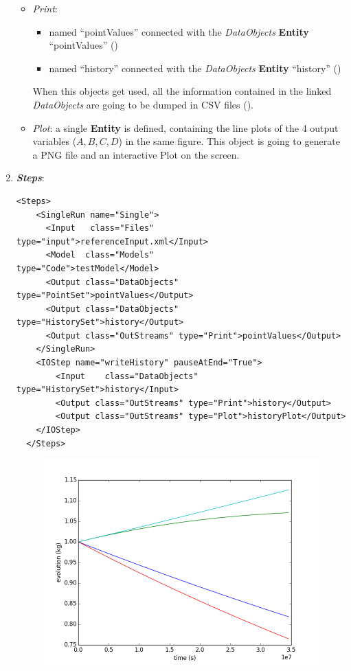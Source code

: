 \begin{enumerate}
  \begin{itemize}
    \item \textit{Print}: 
     \begin{itemize}
       \item named ``pointValues'' connected with the \textit{DataObjects} \textbf{Entity} ``pointValues'' 
                ()
       \item named ``history'' connected with the \textit{DataObjects} \textbf{Entity} ``history'' ()          
     \end{itemize}         
      When this objects get used, all the information contained in the linked  \textit{DataObjects} are going 
    to be dumped in CSV files ().
    \item \textit{Plot}: a single  \textbf{Entity} is defined, containing the line plots of the 4 output variables 
    ($A,B,C,D$) in the same figure. This object is going to generate a PNG file and an interactive Plot on 
    the screen.
  \end{itemize}   
   \item \textbf{\textit{Steps}}:   
\begin{lstlisting}[style=XML,morekeywords={arg,extension,pauseAtEnd,overwrite}]
  <Steps>
    <SingleRun name="Single">
      <Input   class="Files"                        type="input">referenceInput.xml</Input>
      <Model  class="Models"                    type="Code">testModel</Model>
      <Output class="DataObjects"            type="PointSet">pointValues</Output>
      <Output class="DataObjects"            type="HistorySet">history</Output>
      <Output class="OutStreams" type="Print">pointValues</Output>
    </SingleRun>
    <IOStep name="writeHistory" pauseAtEnd="True">
        <Input    class="DataObjects"            type="HistorySet">history</Input>
        <Output class="OutStreams" type="Print">history</Output>
        <Output class="OutStreams" type="Plot">historyPlot</Output>
    </IOStep>
  </Steps>
\end{lstlisting}
 \begin{figure}[h!]
  \centering
  \includegraphics[scale=0.7]{pics/1-historyPlot_line-line-line-line.png}

\end{figure}
\end{enumerate}
